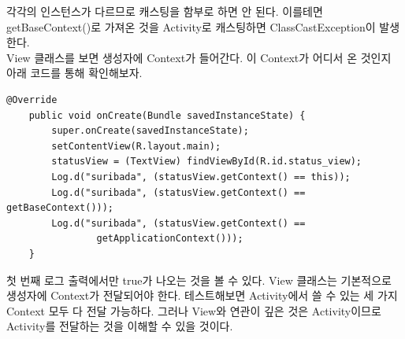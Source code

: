 각각의 인스턴스가 다르므로 캐스팅을 함부로 하면 안 된다. 이를테면 getBaseContext()로 가져온 것을 Activity로 캐스팅하면 ClassCastException이 발생한다.\\

View 클래스를 보면 생성자에 Context가 들어간다. 이 Context가 어디서 온 것인지 아래 코드를 통해 확인해보자.
\begin{lstlisting}[frame=single]
    @Override
    public void onCreate(Bundle savedInstanceState) {
        super.onCreate(savedInstanceState);
        setContentView(R.layout.main);
        statusView = (TextView) findViewById(R.id.status_view);
        Log.d("suribada", (statusView.getContext() == this));
        Log.d("suribada", (statusView.getContext() == getBaseContext()));
        Log.d("suribada", (statusView.getContext() == 
                getApplicationContext()));
    }
\end{lstlisting}
첫 번째 로그 출력에서만 true가 나오는 것을 볼 수 있다. View 클래스는 기본적으로 생성자에 Context가 전달되어야 한다. 테스트해보면 Activity에서 쓸 수 있는 세 가지 Context 모두 다 전달 가능하다. 그러나 View와 연관이 깊은 것은 Activity이므로 Activity를 전달하는 것을 이해할 수 있을 것이다.
